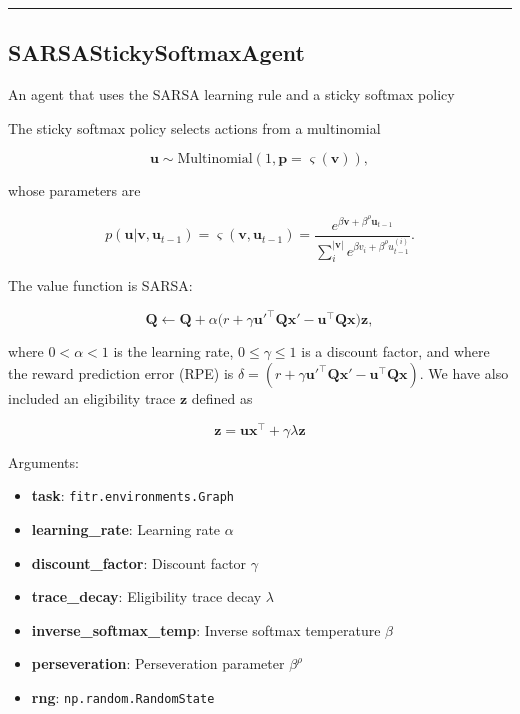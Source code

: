 \begin{center}\rule{0.5\linewidth}{\linethickness}\end{center}

\subsection{SARSAStickySoftmaxAgent}\label{sarsastickysoftmaxagent}

\begin{Shaded}
\begin{Highlighting}[]
\end{Highlighting}
\end{Shaded}

An agent that uses the SARSA learning rule and a sticky softmax policy

The sticky softmax policy selects actions from a multinomial

\[
\mathbf u \sim \mathrm{Multinomial}(1, \mathbf p=\varsigma(\mathbf v)),
\]

whose parameters are

\[
p(\mathbf u|\mathbf v, \mathbf u_{t-1}) = \varsigma(\mathbf v, \mathbf u_{t-1}) = \frac{e^{\beta \mathbf v + \beta^\rho \mathbf u_{t-1}}}{\sum_{i}^{|\mathbf v|} e^{\beta v_i + \beta^\rho u_{t-1}^{(i)}}}.
\]

The value function is SARSA:

\[
\mathbf Q \gets \mathbf Q + \alpha \big(r + \gamma \mathbf u'^\top \mathbf Q \mathbf x' - \mathbf u^\top \mathbf Q \mathbf x \big) \mathbf z,
\]

where \(0 < \alpha < 1\) is the learning rate, \(0 \leq \gamma \leq 1\)
is a discount factor, and where the reward prediction error (RPE) is
\(\delta = (r + \gamma \mathbf u'^\top \mathbf Q \mathbf x' - \mathbf u^\top \mathbf Q \mathbf x)\).
We have also included an eligibility trace \(\mathbf z\) defined as

\[
\mathbf z = \mathbf u \mathbf x^\top +  \gamma \lambda \mathbf z
\]

Arguments:

\begin{itemize}
\tightlist
\item
  \textbf{task}: \texttt{fitr.environments.Graph}
\item
  \textbf{learning\_rate}: Learning rate \(\alpha\)
\item
  \textbf{discount\_factor}: Discount factor \(\gamma\)
\item
  \textbf{trace\_decay}: Eligibility trace decay \(\lambda\)
\item
  \textbf{inverse\_softmax\_temp}: Inverse softmax temperature \(\beta\)
\item
  \textbf{perseveration}: Perseveration parameter \(\beta^\rho\)
\item
  \textbf{rng}: \texttt{np.random.RandomState}
\end{itemize}

